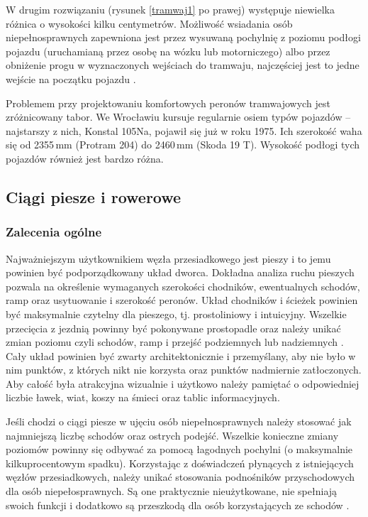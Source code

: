 \documentclass[twoside,12pt]{article}
\begin{document}
	W drugim rozwiązaniu (rysunek \ref{tramwaj1} po prawej) występuje niewielka różnica o wysokości kilku centymetrów. Możliwość wsiadania osób niepełnosprawnych zapewniona jest przez wysuwaną pochylnię z poziomu podłogi pojazdu (uruchamianą przez osobę na wózku lub motorniczego) albo przez obniżenie progu w wyznaczonych wejściach do tramwaju, najczęściej jest to jedne wejście na początku pojazdu \cite{makuch2}.
	
	Problemem przy projektowaniu komfortowych peronów tramwajowych jest zróżnicowany tabor. We Wrocławiu kursuje regularnie osiem typów pojazdów -- najstarszy z nich, Konstal 105Na, pojawił się już w roku 1975. Ich szerokość waha się od 2355\,mm (Protram 204) do 2460\,mm (Skoda 19 T). Wysokość podłogi tych pojazdów również jest bardzo różna. 
	
	\clearpage
	\subsection{Ciągi piesze i rowerowe} \label{sec:ciagi_piesze}
	
	\subsubsection{Zalecenia ogólne}
	
	Najważniejszym użytkownikiem węzła przesiadkowego jest pieszy i to jemu powinien być podporządkowany układ dworca. Dokładna analiza ruchu pieszych pozwala na określenie wymaganych szerokości chodników, ewentualnych schodów, ramp oraz usytuowanie i szerokość peronów. Układ chodników i ścieżek powinien być maksymalnie czytelny dla pieszego, tj. prostoliniowy i intuicyjny. Wszelkie przecięcia z jezdnią powinny być pokonywane prostopadle oraz należy unikać zmian poziomu czyli schodów, ramp i przejść podziemnych lub nadziemnych  \cite{zaluski}. Cały układ powinien być zwarty architektonicznie i przemyślany, aby nie było w nim punktów, z których nikt nie korzysta oraz punktów nadmiernie zatłoczonych. Aby całość była atrakcyjna wizualnie i użytkowo należy pamiętać o odpowiedniej liczbie ławek, wiat, koszy na śmieci oraz tablic informacyjnych. 
	
	Jeśli chodzi o ciągi piesze w ujęciu osób niepełnosprawnych należy stosować jak najmniejszą liczbę schodów oraz ostrych podejść. Wszelkie konieczne zmiany poziomów powinny się odbywać za pomocą łagodnych pochylni (o maksymalnie kilkuprocentowym spadku). Korzystając z doświadczeń płynących z istniejących węzłów przesiadkowych, należy unikać stosowania podnośników przyschodowych dla osób niepełosprawnych. Są one praktycznie nieużytkowane, nie spełniają swoich funkcji i dodatkowo są przeszkodą dla osób korzystających ze schodów \cite{zaluski}. 
	
\end{document}
